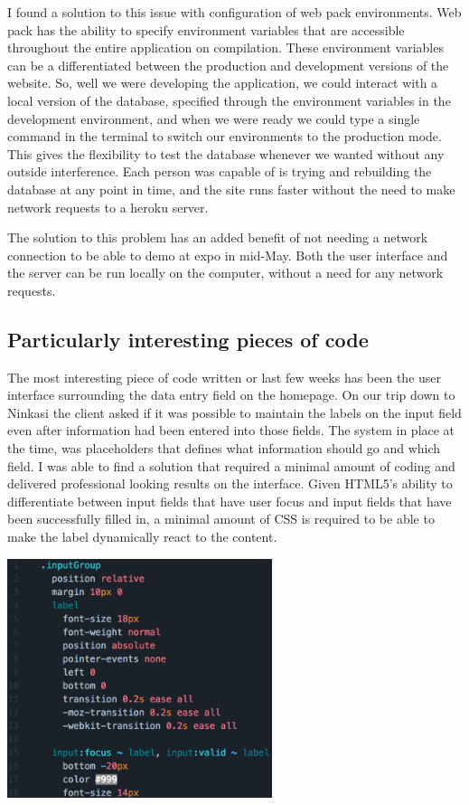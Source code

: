 \documentclass[draftclsnofoot,onecolumn,letterpaper,10pt,compsoc]{IEEEtran}
\begin{document}
I found a solution to this issue with configuration of web pack environments.
Web pack has the ability to specify environment variables that are accessible throughout the entire application on compilation.
These environment variables can be a differentiated between the production and development versions of the website.
So, well we were developing the application, we could interact with a local version of the database, specified through the environment variables in the development environment, and when we were ready we could type a single command in the terminal to switch our environments to the production mode.
This gives the flexibility to test the database whenever we wanted without any outside interference.
Each person was capable of is trying and rebuilding the database at any point in time, and the site runs faster without the need to make network requests to a heroku server.


The solution to this problem has an added benefit of not needing a network connection to be able to demo at expo in mid-May.
Both the user interface and the server can be run locally on the computer, without a need for any network requests.


\subsection{Particularly interesting pieces of code}

The most interesting piece of code written or last few weeks has been the user interface surrounding the data entry field on the homepage.
On our trip down to Ninkasi the client asked if it was possible to maintain the labels on the input field even after information had been entered into those fields.
The system in place at the time, was placeholders that defines what information should go and which field.
I was able to find a solution that required a minimal amount of coding and delivered professional looking results on the interface.
Given HTML5’s ability to differentiate between input fields that have user focus and input fields that have been successfully filled in, a minimal amount of CSS is required to be able to make the label dynamically react to the content.

\centerline{\includegraphics[height=7cm]{screenshots/inputLabel.png}}
\end{document}
